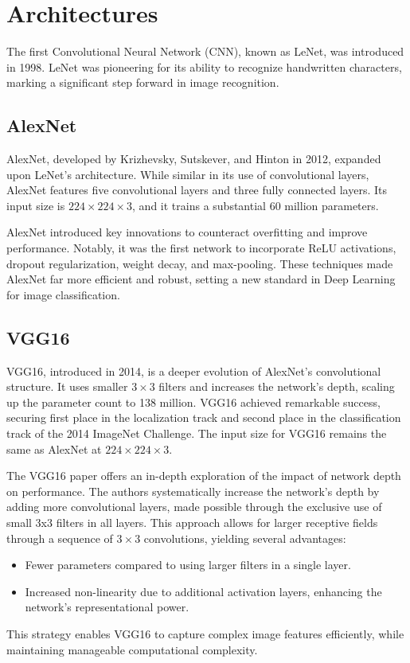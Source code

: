 \section{Architectures}

The first Convolutional Neural Network (CNN), known as LeNet, was introduced in 1998. 
LeNet was pioneering for its ability to recognize handwritten characters, marking a significant step forward in image recognition.

\subsection{AlexNet}
AlexNet, developed by Krizhevsky, Sutskever, and Hinton in 2012, expanded upon LeNet's architecture. 
While similar in its use of convolutional layers, AlexNet features five convolutional layers and three fully connected layers. 
Its input size is $224 \times 224 \times 3$, and it trains a substantial 60 million parameters.

AlexNet introduced key innovations to counteract overfitting and improve performance. Notably, it was the first network to incorporate ReLU activations, dropout regularization, weight decay, and max-pooling. 
These techniques made AlexNet far more efficient and robust, setting a new standard in Deep Learning for image classification.

\subsection{VGG16}
VGG16, introduced in 2014, is a deeper evolution of AlexNet's convolutional structure. 
It uses smaller $3\times 3$ filters and increases the network's depth, scaling up the parameter count to 138 million. 
VGG16 achieved remarkable success, securing first place in the localization track and second place in the classification track of the 2014 ImageNet Challenge. 
The input size for VGG16 remains the same as AlexNet at $224 \times 224 \times 3$.

The VGG16 paper offers an in-depth exploration of the impact of network depth on performance. 
The authors systematically increase the network's depth by adding more convolutional layers, made possible through the exclusive use of small 3x3 filters in all layers. 
This approach allows for larger receptive fields through a sequence of $3\times 3$ convolutions, yielding several advantages:
\begin{itemize}
    \item Fewer parameters compared to using larger filters in a single layer.
    \item Increased non-linearity due to additional activation layers, enhancing the network's representational power.
\end{itemize}
This strategy enables VGG16 to capture complex image features efficiently, while maintaining manageable computational complexity.

